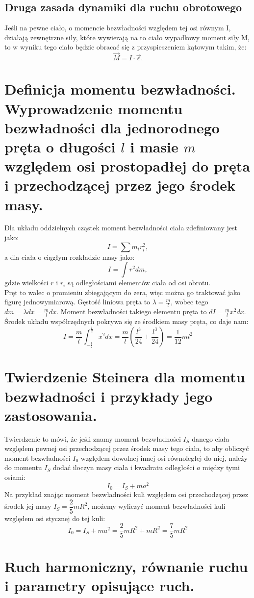 \documentclass[a4paper,11pt]{article}
\begin{document}
\subsection{Druga zasada dynamiki dla ruchu obrotowego}
Jeśli na pewne ciało, o momencie bezwładności względem tej osi równym I, działają zewnętrzne siły, które wywierają na to ciało wypadkowy moment siły M, to w wyniku tego ciało będzie obracać się z przyspieszeniem kątowym takim, że: 
$$\vec{M}=I \cdot \vec{\epsilon}.$$

\section{Definicja momentu bezwładności. Wyprowadzenie momentu bezwładności dla jednorodnego pręta o długości $l$ i masie $m$ względem osi prostopadłej do pręta i przechodzącej przez jego środek masy.}
Dla układu oddzielnych cząstek moment bezwładności ciała zdefiniowany jest jako:
$$I=\sum m_{i}r_{i}^{2},$$
a dla ciała o ciągłym rozkładzie masy jako:
$$I=\int r^{2}dm,$$
gdzie wielkości $r$ i $r_{i}$ są odległościami elementów ciała od osi obrotu.
$$$$
Pręt to walec o promieniu zbiegającym do zera, więc można go traktować jako figurę jednowymiarową. Gęstość liniowa pręta to $\lambda = \frac{m}{l}$, wobec tego $dm = \lambda dx = \frac{m}{l} dx$. Moment bezwładności takiego elementu pręta to $dI = \frac{m}{l} x^2 dx$. Środek układu współrzędnych pokrywa się ze środkiem masy pręta, co daje nam: 
$$I = \frac{m}{l} \int_{-\frac{l}{2}}^{\frac{l}{2}} x^2 dx = \frac{m}{l} \left( \frac{l^3}{24} + \frac{l^3}{24}\right) = \frac{1}{12} ml^2$$

\section{Twierdzenie Steinera dla momentu bezwładności i przykłady jego zastosowania.}
Twierdzenie to mówi, że jeśli znamy moment bezwładności $I_{S}$ danego ciała względem pewnej osi przechodzącej przez środek masy tego ciała, to aby obliczyć moment bezwładności $I_{0}$ względem dowolnej innej osi równoległej do niej, należy do momentu $I_{S}$ dodać iloczyn masy ciała i kwadratu odległości $a$ między tymi osiami:
$$I_{0}=I_{S}+ma^{2}$$
Na przykład znając moment bezwładności kuli względem osi przechodzącej przez środek jej masy $I_{S}=\dfrac{2}{5}mR^{2}$, możemy wyliczyć moment bezwładności kuli względem osi stycznej do tej kuli:
$$I_{0}=I_{S}+ma^{2}=\dfrac{2}{5}mR^{2}+mR^{2}=\dfrac{7}{5}mR^{2}$$

\section{Ruch harmoniczny, równanie ruchu i parametry opisujące ruch.}
\end{document}
